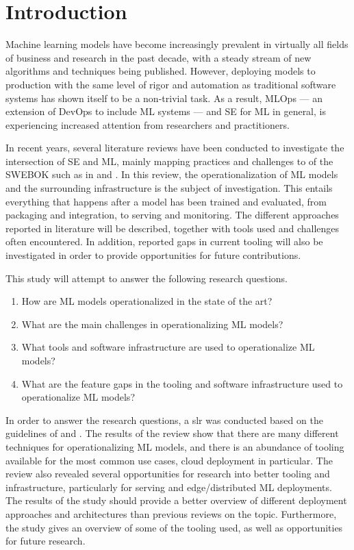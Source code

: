 \chapter{Introduction}
\label{ch:introduction}
Machine learning models have become increasingly prevalent in virtually all fields of business and research in the past decade, with a steady stream of new algorithms and techniques being published.
However, deploying models to production with the same level of rigor and automation as traditional software systems has shown itself to be a non-trivial task.
As a result, MLOps --- an extension of DevOps to include ML systems --- and SE for ML in general, is experiencing increased attention from researchers and practitioners.

In recent years, several literature reviews have been conducted to investigate the intersection of SE and ML, mainly mapping practices and challenges to  of the SWEBOK \cite{Bourque2014} such as in \cite{Kumeno2020} and \cite{Nascimento2020}.
In this review, the operationalization of ML models and the surrounding infrastructure is the subject of investigation.
This entails everything that happens after a model has been trained and evaluated, from packaging and integration, to serving and monitoring.
The different approaches reported in literature will be described, together with tools used and challenges often encountered.
In addition, reported gaps in current tooling will also be investigated in order to provide opportunities for future contributions.

This study will attempt to answer the following research questions.
\begin{enumerate}
    \item How are ML models operationalized in the state of the art?
    \item What are the main challenges in operationalizing ML models?
    \item What tools and software infrastructure are used to operationalize ML models?
    \item What are the feature gaps in the tooling and software infrastructure used to operationalize ML models?
\end{enumerate}
In order to answer the research questions, a \acrfull{slr} was conducted based on the guidelines of \cite{Kitchenham07guidelinesfor} and \cite{Wohlin2014}.
The results of the review show that there are many different techniques for operationalizing ML models, and there is an abundance of tooling available for the most common use cases, cloud deployment in particular.
The review also revealed several opportunities for research into better tooling and infrastructure, particularly for serving and edge/distributed ML deployments.
The results of the study should provide a better overview of different deployment approaches and architectures than previous reviews on the topic.
Furthermore, the study gives an overview of some of the tooling used, as well as opportunities for future research.

